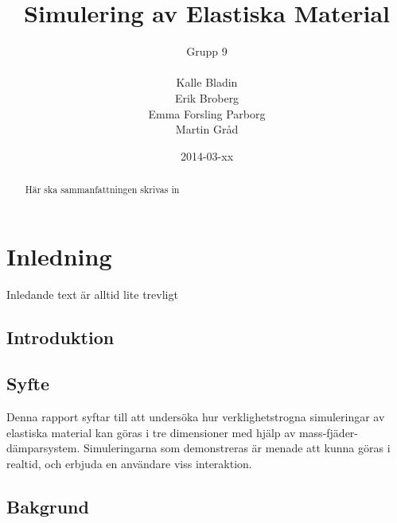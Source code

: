 \documentclass[a4paper,12pt,oneside,final,swedish]{extarticle}
\begin{document}
\author{Grupp 9\\\\Kalle Bladin\\Erik Broberg\\Emma Forsling Parborg\\Martin Gråd}
\title{Simulering av Elastiska Material}
\clearpage\maketitle %
\thispagestyle{empty}
\date{2014-03-xx}
\pagebreak




\begin{abstract}
\thispagestyle{empty}
Här ska sammanfattningen skrivas in
\hfill
\end{abstract}
\pagebreak 

\tableofcontents  %
\listoffigures    %
\listoftables     %

\pagebreak
\pagestyle{plain}
\setcounter{page}{1}

\section{Inledning}
Inledande text är alltid lite trevligt
\subsection{Introduktion}
\subsection{Syfte}
Denna rapport syftar till att undersöka hur verklighetstrogna simuleringar av elastiska material kan göras i tre dimensioner med hjälp av mass-fjäder-dämparsystem. 
Simuleringarna som demonstreras är menade att kunna göras i realtid, och erbjuda en användare viss interaktion.

\subsection{Bakgrund}
\end{document}
